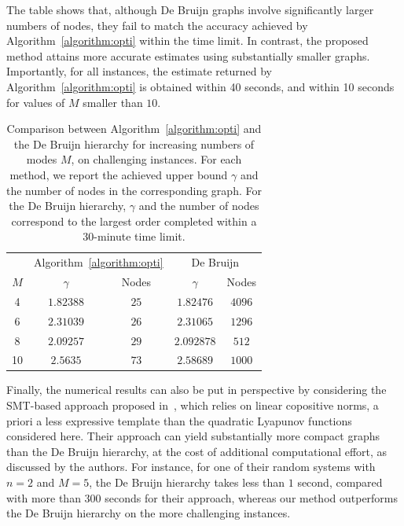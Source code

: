 \documentclass[letterpaper, 10 pt, conference]{ieeeconf}  %
\begin{document}
The table shows that, although De Bruijn graphs involve significantly
larger numbers of nodes, they fail to match the accuracy achieved by
Algorithm~\ref{algorithm:opti} within the time limit. In contrast, the
proposed method attains more accurate estimates using substantially
smaller graphs. Importantly, for all instances, the estimate returned by
Algorithm~\ref{algorithm:opti} is obtained within 40 seconds, and within
10 seconds for values of $M$ smaller than $10$.

\begin{table}[H]
\centering
\begin{tabular}{c|cc|cc}
\hline
 & \multicolumn{2}{c|}{Algorithm~\ref{algorithm:opti}} 
 & \multicolumn{2}{c}{De Bruijn} \\
$M$ & $\gamma$ & Nodes & $\gamma$ & Nodes  \\
\hline
4  & $1.82388$ & $25$ &  $1.82476$ & $4096$   \\
6 &  $2.31039$ & $26$ &  $2.31065$& $1296$  \\
8  & $2.09257$ & $29$ &  $2.092878$  & $512$ \\
10 & $2.5635$ & $73$ & $2.58689$ & $1000$  \\
\hline
\end{tabular}
\caption{Comparison between Algorithm~\ref{algorithm:opti} and the De Bruijn
hierarchy for increasing numbers of modes $M$, on challenging
instances. For each method, we report
the achieved upper bound $\gamma$ and the number of nodes in the corresponding graph. For the De Bruijn hierarchy, $\gamma$ and the number of nodes correspond
to the largest order completed within a 30-minute time limit.}
\label{tab:comparison_M}
\end{table}
Finally, the numerical results can also be put in perspective by considering
the SMT-based approach proposed in~\cite{debauche2026}, which relies on linear
copositive norms, a priori a less expressive template than the quadratic
Lyapunov functions considered here. Their approach can yield substantially more compact
graphs than the De Bruijn hierarchy, at the cost of additional computational
effort, as discussed by the authors. For instance, for one of their random
systems with \(n=2\) and \(M=5\), the De Bruijn hierarchy takes less than
\(1\) second, compared with more than \(300\) seconds for their approach,
whereas our method outperforms the De Bruijn hierarchy on the more
challenging instances.
\end{document}
